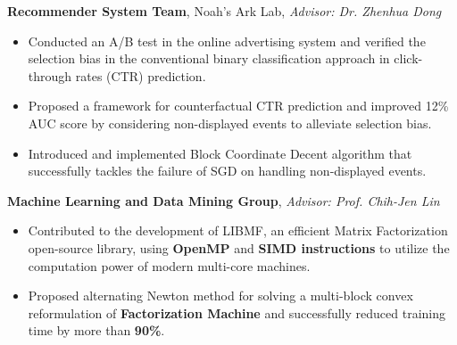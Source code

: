 \documentclass[11pt,a4paper]{moderncv}
\begin{document}
{\textbf{Recommender System Team}, Noah's Ark Lab, \emph{Advisor: Dr. Zhenhua Dong}
\begin{itemize}%
    \item Conducted an A/B test in the online advertising system and verified the selection bias in the conventional binary classification approach in click-through rates (CTR) prediction.
    \item Proposed a framework for counterfactual CTR prediction and improved 12\% AUC score by considering non-displayed events to alleviate selection bias. %
    \item Introduced and implemented Block Coordinate Decent algorithm that successfully tackles the failure of SGD on handling non-displayed events.
\end{itemize}
}



{\textbf{Machine Learning and Data Mining Group}, \emph{Advisor: Prof. Chih-Jen Lin}
\begin{itemize}%
\item Contributed to the development of LIBMF, an efficient Matrix Factorization open-source library,
    using \textbf{OpenMP} and \textbf{SIMD instructions} to utilize the computation power of modern multi-core machines.
\item Proposed alternating Newton method for solving a multi-block convex reformulation of \textbf{Factorization Machine} and successfully reduced training time by more than \textbf{90\%}.
\end{itemize}
}
\end{document}
